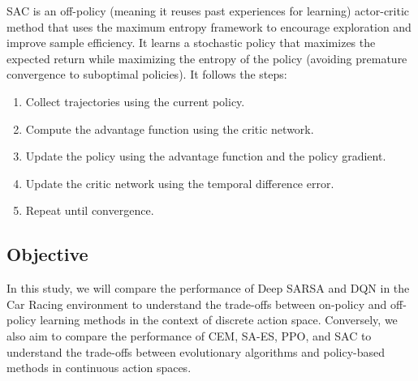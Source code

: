 \documentclass[../CSC_52081_EP.tex]{subfiles}
\begin{document}
    SAC is an off-policy (meaning it reuses past experiences for learning) actor-critic method that uses the maximum entropy framework to encourage exploration and improve sample efficiency. It learns a stochastic policy that maximizes the expected return while maximizing the entropy of the policy (avoiding premature convergence to suboptimal policies). It follows the steps:
    \begin{enumerate}
        \item Collect trajectories using the current policy.
        \item Compute the advantage function using the critic network.
        \item Update the policy using the advantage function and the policy gradient.
        \item Update the critic network using the temporal difference error.
        \item Repeat until convergence.
    \end{enumerate}

    \subsection{Objective}
    In this study, we will compare the performance of Deep SARSA and DQN in the Car Racing environment to understand the trade-offs between on-policy and off-policy learning methods in the context of discrete action space. Conversely, we also aim to compare the performance of CEM, SA-ES, PPO, and SAC to understand the trade-offs between evolutionary algorithms and policy-based methods in continuous action spaces.
\end{document}

